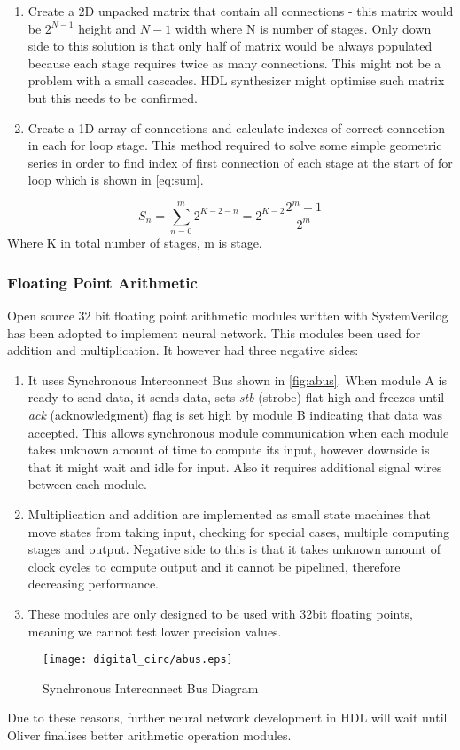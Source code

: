 \begin{enumerate}
  \item Create a 2D unpacked matrix that contain all connections - this matrix would be $2^{N-1}$ height and $N-1$ width where N is number of stages. Only down side to this solution is that only half of matrix would be always populated because each stage requires twice as many connections. This might not be a problem with a small cascades. HDL synthesizer might optimise such matrix but this needs to be confirmed.
  \item Create a 1D array of connections and calculate indexes of correct connection in each for loop stage. This method required to solve some simple geometric series in order to find index of first connection of each stage at the start of for loop which is shown in \autoref{eq:sum}.
\end{enumerate}

\begin{equation}\label{eq:sum}
    S_n = \sum_{n=0}^m 2^{K-2-n} = 2^{K-2}\frac{2^m-1}{2^m}
\end{equation}
Where K in total number of stages, m is stage.


\subsubsection{Floating Point Arithmetic}

Open source 32 bit floating point arithmetic modules written with SystemVerilog has been adopted to implement neural network. This modules been used for addition and multiplication. It however had three negative sides:
\begin{enumerate}
  \item It uses Synchronous Interconnect Bus shown in \autoref{fig:abus}. When module A is ready to send data, it sends data, sets \textit{stb} (strobe) flat high and freezes until \textit{ack} (acknowledgment) flag is set high by module B indicating that data was accepted. This allows synchronous module communication when each module takes unknown amount of time to compute its input, however downside is that it might wait and idle for input. Also it requires additional signal wires between each module.
  \item Multiplication and addition are implemented as small state machines that move states from taking input, checking for special cases, multiple computing stages and output. Negative side to this is that it takes unknown amount of clock cycles to compute output and it cannot be pipelined, therefore decreasing performance.
  \item These modules are only designed to be used with 32bit floating points, meaning we cannot test lower precision values.
\end{enumerate}

\begin{figure}[H]
    \centering
    \texttt{[image: digital\_circ/abus.eps]}
    \caption{Synchronous Interconnect Bus Diagram}
    \label{fig:abus}
\end{figure}
        
Due to these reasons, further neural network development in HDL will wait until Oliver finalises better arithmetic operation modules.
